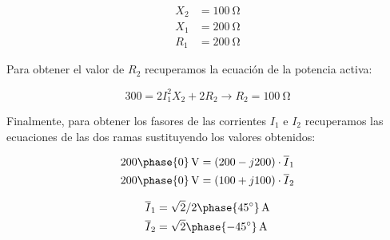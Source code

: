 \documentclass[12pt]{article}
\begin{document}
\begin{align*}
  X_2 &= \SI{100}{\ohm}\\
  X_1 &= \SI{200}{\ohm}\\
  R_1 &= \SI{200}{\ohm}
\end{align*}

Para obtener el valor de $R_2$ recuperamos la ecuación de la potencia activa:

\[
  300 = 2I_1^2 X_2 + 2 R_2 \rightarrow R_2 = \SI{100}{\ohm}
\]

Finalmente, para obtener los fasores de las corrientes $I_1$ e $I_2$ recuperamos las ecuaciones de las dos ramas sustituyendo los valores obtenidos:

\begin{align*}
   \SI[parse-numbers=false]{200\phase{0}}{\volt} &= (200 - j200) \cdot \overline{I}_1\\
   \SI[parse-numbers=false]{200\phase{0}}{\volt} &= (100 + j100) \cdot \overline{I}_2
\end{align*}

\begin{align*}
  \overline{I}_1 &= \SI[parse-numbers=false]{\sqrt{2}/2\phase{\ang{45}}}{\ampere}\\
  \overline{I}_2 &= \SI[parse-numbers=false]{\sqrt{2}\phase{\ang{-45}}}{\ampere}
\end{align*}

\clearpage

\section{}


\end{document}
